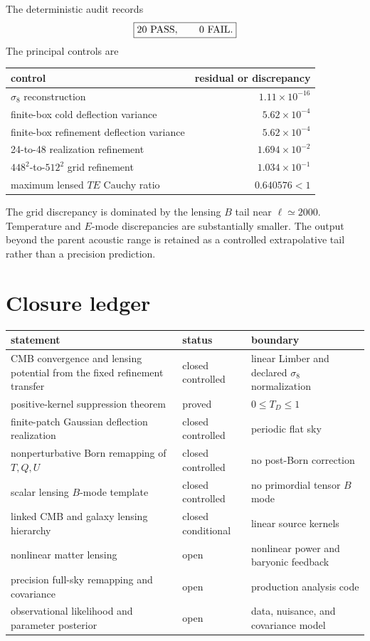 The deterministic audit records
\begin{equation}
 \boxed{
 20\ {\rm PASS},
 \qquad
 0\ {\rm FAIL}.
 }
 \label{eq:lens-pass-count}
\end{equation}
The principal controls are
\begin{center}
\begin{tabular}{lr}
\toprule
control & residual or discrepancy\\
\midrule
$\sigma_8$ reconstruction & $1.11\times10^{-16}$\\
finite-box cold deflection variance & $5.62\times10^{-4}$\\
finite-box refinement deflection variance & $5.62\times10^{-4}$\\
24-to-48 realization refinement & $1.694\times10^{-2}$\\
$448^2$-to-$512^2$ grid refinement & $1.034\times10^{-1}$\\
maximum lensed $TE$ Cauchy ratio & $0.640576<1$\\
\bottomrule
\end{tabular}
\end{center}
The grid discrepancy is dominated by the lensing $B$ tail near $\ell\simeq2000$.  Temperature and $E$-mode discrepancies are substantially smaller.  The output beyond the parent acoustic range is retained as a controlled extrapolative tail rather than a precision prediction.

\section{Closure ledger}

\begin{center}
\begin{tabularx}{\textwidth}{>{\raggedright\arraybackslash}X>{\raggedright\arraybackslash}p{}>{\raggedright\arraybackslash}p{}}
\toprule
statement & status & boundary\\
\midrule
CMB convergence and lensing potential from the fixed refinement transfer & closed controlled & linear Limber and declared $\sigma_8$ normalization\\
positive-kernel suppression theorem & proved & $0\leq T_D\leq1$\\
finite-patch Gaussian deflection realization & closed controlled & periodic flat sky\\
nonperturbative Born remapping of $T,Q,U$ & closed controlled & no post-Born correction\\
scalar lensing $B$-mode template & closed controlled & no primordial tensor $B$ mode\\
linked CMB and galaxy lensing hierarchy & closed conditional & linear source kernels\\
nonlinear matter lensing & open & nonlinear power and baryonic feedback\\
precision full-sky remapping and covariance & open & production analysis code\\
observational likelihood and parameter posterior & open & data, nuisance, and covariance model\\
\bottomrule
\end{tabularx}
\end{center}

